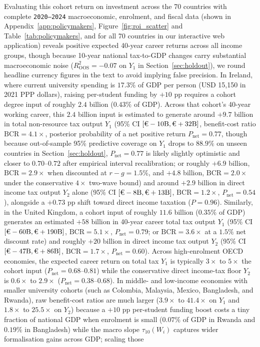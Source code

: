 \documentclass[11pt,a4paper]{article}
\begin{document}
Evaluating this cohort return on investment across the 70 countries with complete \texttt{2020--2024} macroeconomic, enrolment, and fiscal data (shown in Appendix~\ref{app:policymakers}, Figure~\ref{fig:roi_scatter} and Table~\ref{tab:policymakers}, and for all 70 countries in our interactive web application) reveals positive expected 40-year career returns across all income groups, though because 10-year national tax-to-GDP changes carry substantial macroeconomic noise ($R^2_{\text{OOS}} = -0.07$ on $Y_1$ in Section~\ref{sec:holdout}), we round headline currency figures in the text to avoid implying false precision. In Ireland, where current university spending is $17.3\%$ of GDP per person (USD 15,150 in 2021 PPP dollars), raising per-student funding by $+10$ pp requires a cohort degree input of roughly \texteuro$2.4$ billion ($0.43\%$ of GDP). Across that cohort's 40-year working career, this \texteuro$2.4$ billion input is estimated to generate around \texteuro$+9.7$ billion in total non-resource tax output $Y_1$ (95\% CI $[\text{\texteuro}-10\text{B}, \text{\texteuro}+32\text{B}]$, benefit-cost ratio $\text{BCR} = 4.1\times$, posterior probability of a net positive return $P_{\text{net}} = 0.77$, though because out-of-sample 95\% predictive coverage on $Y_1$ drops to $88.9\%$ on unseen countries in Section~\ref{sec:holdout}, $P_{\text{net}} = 0.77$ is likely slightly optimistic and closer to $0.70\text{--}0.72$ after empirical interval recalibration; or roughly \texteuro$+6.9$ billion, $\text{BCR} = 2.9\times$ when discounted at $r - g = 1.5\%$, and \texteuro$+4.8$ billion, $\text{BCR} = 2.0\times$ under the conservative $4\times$ two-wave bound) and around \texteuro$+2.9$ billion in direct income tax output $Y_2$ alone (95\% CI $[\text{\texteuro}-8\text{B}, \text{\texteuro}+13\text{B}]$, $\text{BCR} = 1.2\times$, $P_{\text{net}} = 0.54$), alongside a $+0.73$ pp shift toward direct income taxation ($P = 0.96$). Similarly, in the United Kingdom, a cohort input of roughly \texteuro$11.6$ billion ($0.35\%$ of GDP) generates an estimated \texteuro$+58$ billion in 40-year career total tax output $Y_1$ (95\% CI $[\text{\texteuro}-60\text{B}, \text{\texteuro}+190\text{B}]$, $\text{BCR} = 5.1\times$, $P_{\text{net}} = 0.79$; or $\text{BCR} = 3.6\times$ at a $1.5\%$ net discount rate) and roughly \texteuro$+20$ billion in direct income tax output $Y_2$ (95\% CI $[\text{\texteuro}-47\text{B}, \text{\texteuro}+86\text{B}]$, $\text{BCR} = 1.7\times$, $P_{\text{net}} = 0.60$). Across high-enrolment OECD economies, the expected career return on total tax $Y_1$ is typically $3\times$ to $5\times$ the cohort input ($P_{\text{net}} = 0.68\text{--}0.81$) while the conservative direct income-tax floor $Y_2$ is $0.6\times$ to $2.9\times$ ($P_{\text{net}} = 0.38\text{--}0.68$). In middle- and low-income economies with smaller university cohorts (such as Colombia, Malaysia, Mexico, Bangladesh, and Rwanda), raw benefit-cost ratios are much larger ($3.9\times$ to $41.4\times$ on $Y_1$ and $1.8\times$ to $25.5\times$ on $Y_2$) because a $+10$ pp per-student funding boost costs a tiny fraction of national GDP when enrolment is small ($0.07\%$ of GDP in Rwanda and $0.19\%$ in Bangladesh) while the macro slope $\tau_{10}(W_i)$ captures wider formalisation gains across GDP; scaling those 
\end{document}
